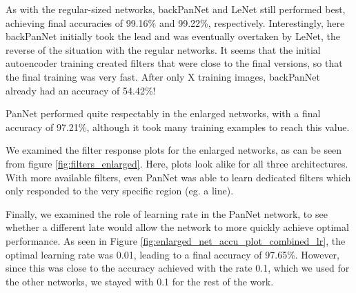 As with the regular-sized networks, backPanNet and LeNet still performed best, achieving final accuracies of 99.16\% and 99.22\%, respectively. Interestingly, here backPanNet initially took the lead and was eventually overtaken by LeNet, the reverse of the situation with the regular networks. It seems that the initial autoencoder training created filters that were close to the final versions, so that the final training was very fast. After only X training images, backPanNet already had an accuracy of 54.42\%!

PanNet performed quite respectably in the enlarged networks, with a final accuracy of 97.21\%, although it took many training examples to reach this value.

We examined the filter response plots for the enlarged networks, as can be seen from figure \ref{fig:filters_enlarged}. Here, plots look alike for all three architectures. With more available filters, even PanNet was able to learn dedicated filters which only responded to the very specific region (eg. a line). 

Finally, we examined the role of learning rate in the PanNet network, to see whether a different late would allow the network to more quickly achieve optimal performance. As seen in Figure \ref{fig:enlarged_net_accu_plot_combined_lr}, the optimal learning rate was 0.01, leading to a final accuracy of 97.65\%. However, since this was close to the accuracy achieved with the rate 0.1, which we used for the other networks, we stayed with 0.1 for the rest of the work.



